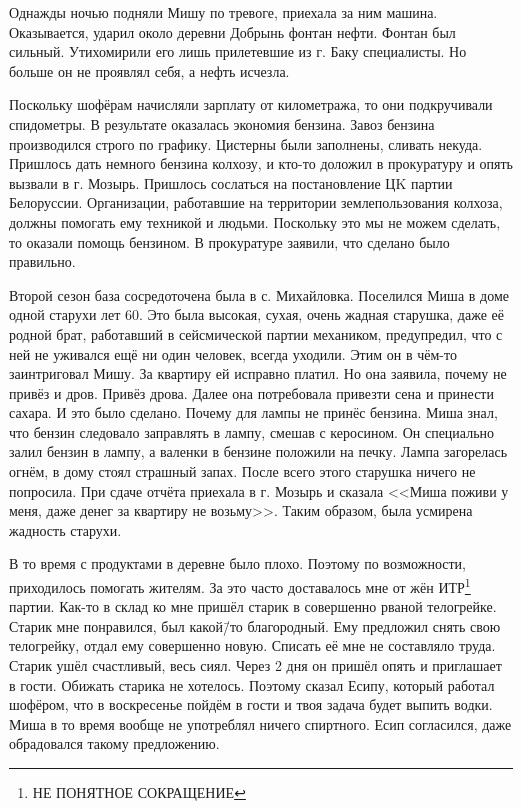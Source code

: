 Однажды ночью подняли Мишу по тревоге, приехала за ним машина. Оказывается, ударил около деревни Добрынь фонтан нефти. Фонтан был сильный. Утихомирили его лишь прилетевшие из г. Баку специалисты. Но больше он не проявлял себя, а нефть исчезла. 

Поскольку шофёрам начисляли зарплату от километража, то они подкручивали спидометры. В результате оказалась экономия бензина. Завоз бензина производился строго по графику. Цистерны были заполнены, сливать некуда. Пришлось дать немного бензина колхозу, и кто-то доложил в прокуратуру и опять вызвали в г. Мозырь. Пришлось сослаться на постановление ЦK партии Белоруссии. Организации, работавшие на территории землепользования колхоза, должны помогать ему техникой и людьми. Поскольку это мы не можем сделать, то оказали помощь бензином. В прокуратуре заявили, что сделано было правильно.

Второй сезон база сосредоточена была в с. Михайловка. Поселился Миша в доме одной старухи лет 60. Это была высокая, сухая, очень жадная старушка, даже её родной брат, работавший в сейсмической партии механиком, предупредил, что с ней не уживался ещё ни один человек, всегда уходили. Этим он в чём-то заинтриговал Мишу. За квартиру ей исправно платил. Но она заявила, почему не привёз и дров. Привёз дрова. Далее она потребовала привезти сена и принести сахара. И это было сделано. Почему для лампы не принёс бензина. Миша знал, что бензин следовало заправлять в лампу, смешав с керосином. Он специально залил бензин в лампу, а валенки в бензине положили на печку. Лампа загорелась огнём, в дому стоял страшный запах. После всего этого старушка ничего не попросила. При сдаче отчёта приехала в г. Мозырь и сказала <<Миша поживи у меня, даже денег за квартиру не возьму>>. Таким образом, была усмирена жадность старухи.

В то время с продуктами в деревне было плохо. Поэтому по возможности, приходилось помогать жителям. За это часто доставалось мне от жён ИТР\footnote{НЕ ПОНЯТНОЕ СОКРАЩЕНИЕ} партии. Как-то в склад ко мне пришёл старик в совершенно рваной телогрейке. Старик мне понравился, был какой\=/то благородный. Ему предложил снять свою телогрейку, отдал ему совершенно новую. Списать её мне не составляло труда. Старик ушёл счастливый, весь сиял. Через 2 дня он пришёл опять и приглашает в гости. Обижать старика не хотелось. Поэтому сказал Есипу, который работал шофёром, что в воскресенье пойдём в гости и твоя задача будет выпить водки. Миша в то время вообще не употреблял ничего спиртного. Есип согласился, даже обрадовался такому предложению. 

